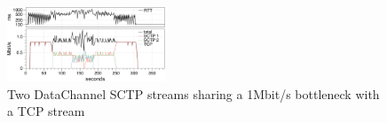 \documentclass{sig-alternate}
\begin{document}
\begin{figure}[t]
  \centering
    \includegraphics[width=0.42\textwidth]{figs/2sctp_tcp}
\vspace*{-0.38cm}
	\caption{\small{Two DataChannel SCTP  streams sharing a 1Mbit/s bottleneck with a TCP stream}} \label{fig:2sctp_tcp}
\vspace*{-0.4cm}
\end{figure}
\vspace{-0.2cm}


\end{document}

